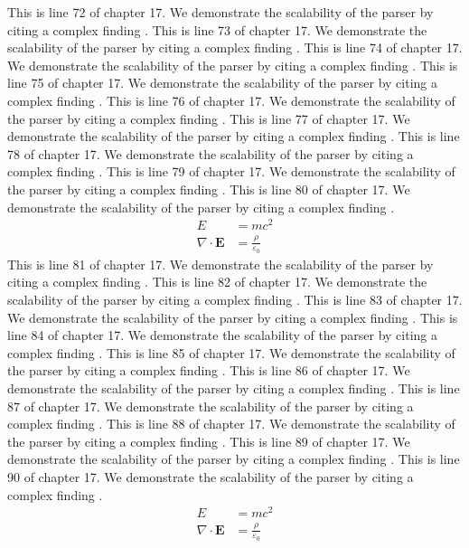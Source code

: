 This is line 72 of chapter 17. We demonstrate the scalability of the parser by citing a complex finding \cite{ref17_72}.
This is line 73 of chapter 17. We demonstrate the scalability of the parser by citing a complex finding \cite{ref17_73}.
This is line 74 of chapter 17. We demonstrate the scalability of the parser by citing a complex finding \cite{ref17_74}.
This is line 75 of chapter 17. We demonstrate the scalability of the parser by citing a complex finding \cite{ref17_75}.
This is line 76 of chapter 17. We demonstrate the scalability of the parser by citing a complex finding \cite{ref17_76}.
This is line 77 of chapter 17. We demonstrate the scalability of the parser by citing a complex finding \cite{ref17_77}.
This is line 78 of chapter 17. We demonstrate the scalability of the parser by citing a complex finding \cite{ref17_78}.
This is line 79 of chapter 17. We demonstrate the scalability of the parser by citing a complex finding \cite{ref17_79}.
This is line 80 of chapter 17. We demonstrate the scalability of the parser by citing a complex finding \cite{ref17_80}.
\begin{align*}
  E &= mc^2 \\
  \nabla \cdot \mathbf{E} &= \frac{\rho}{\varepsilon_0}
\end{align*}
This is line 81 of chapter 17. We demonstrate the scalability of the parser by citing a complex finding \cite{ref17_81}.
This is line 82 of chapter 17. We demonstrate the scalability of the parser by citing a complex finding \cite{ref17_82}.
This is line 83 of chapter 17. We demonstrate the scalability of the parser by citing a complex finding \cite{ref17_83}.
This is line 84 of chapter 17. We demonstrate the scalability of the parser by citing a complex finding \cite{ref17_84}.
This is line 85 of chapter 17. We demonstrate the scalability of the parser by citing a complex finding \cite{ref17_85}.
This is line 86 of chapter 17. We demonstrate the scalability of the parser by citing a complex finding \cite{ref17_86}.
This is line 87 of chapter 17. We demonstrate the scalability of the parser by citing a complex finding \cite{ref17_87}.
This is line 88 of chapter 17. We demonstrate the scalability of the parser by citing a complex finding \cite{ref17_88}.
This is line 89 of chapter 17. We demonstrate the scalability of the parser by citing a complex finding \cite{ref17_89}.
This is line 90 of chapter 17. We demonstrate the scalability of the parser by citing a complex finding \cite{ref17_90}.
\begin{align*}
  E &= mc^2 \\
  \nabla \cdot \mathbf{E} &= \frac{\rho}{\varepsilon_0}
\end{align*}
